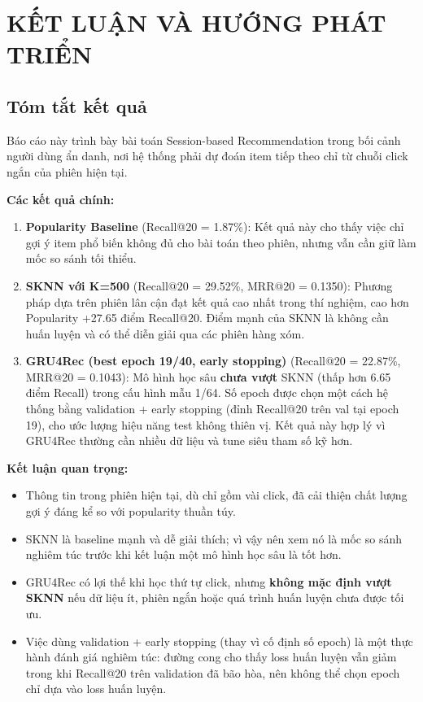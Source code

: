 \documentclass[12pt, a4paper]{article}
\begin{document}
\section{KẾT LUẬN VÀ HƯỚNG PHÁT TRIỂN}
\label{chap:conclusion}

\subsection{Tóm tắt kết quả}

Báo cáo này trình bày bài toán Session-based Recommendation trong bối cảnh người dùng ẩn danh, nơi hệ thống phải dự đoán item tiếp theo chỉ từ chuỗi click ngắn của phiên hiện tại.

\textbf{Các kết quả chính:}

\begin{enumerate}
    \item \textbf{Popularity Baseline} (Recall@20 = 1.87\%): Kết quả này cho thấy việc chỉ gợi ý item phổ biến không đủ cho bài toán theo phiên, nhưng vẫn cần giữ làm mốc so sánh tối thiểu.

    \item \textbf{SKNN với K=500} (Recall@20 = 29.52\%, MRR@20 = 0.1350): Phương pháp dựa trên phiên lân cận đạt kết quả cao nhất trong thí nghiệm, cao hơn Popularity +27.65 điểm Recall@20. Điểm mạnh của SKNN là không cần huấn luyện và có thể diễn giải qua các phiên hàng xóm.

    \item \textbf{GRU4Rec (best epoch 19/40, early stopping)} (Recall@20 = 22.87\%, MRR@20 = 0.1043): Mô hình học sâu \textbf{chưa vượt} SKNN (thấp hơn 6.65 điểm Recall) trong cấu hình mẫu 1/64. Số epoch được chọn một cách hệ thống bằng validation + early stopping (đỉnh Recall@20 trên val tại epoch 19), cho ước lượng hiệu năng test không thiên vị. Kết quả này hợp lý vì GRU4Rec thường cần nhiều dữ liệu và tune siêu tham số kỹ hơn.
\end{enumerate}

\textbf{Kết luận quan trọng:}
\begin{itemize}
    \item Thông tin trong phiên hiện tại, dù chỉ gồm vài click, đã cải thiện chất lượng gợi ý đáng kể so với popularity thuần túy.
    \item SKNN là baseline mạnh và dễ giải thích; vì vậy nên xem nó là mốc so sánh nghiêm túc trước khi kết luận một mô hình học sâu là tốt hơn.
    \item GRU4Rec có lợi thế khi học thứ tự click, nhưng \textbf{không mặc định vượt SKNN} nếu dữ liệu ít, phiên ngắn hoặc quá trình huấn luyện chưa được tối ưu.
    \item Việc dùng validation + early stopping (thay vì cố định số epoch) là một thực hành đánh giá nghiêm túc: đường cong cho thấy loss huấn luyện vẫn giảm trong khi Recall@20 trên validation đã bão hòa, nên không thể chọn epoch chỉ dựa vào loss huấn luyện.
\end{itemize}
\end{document}
